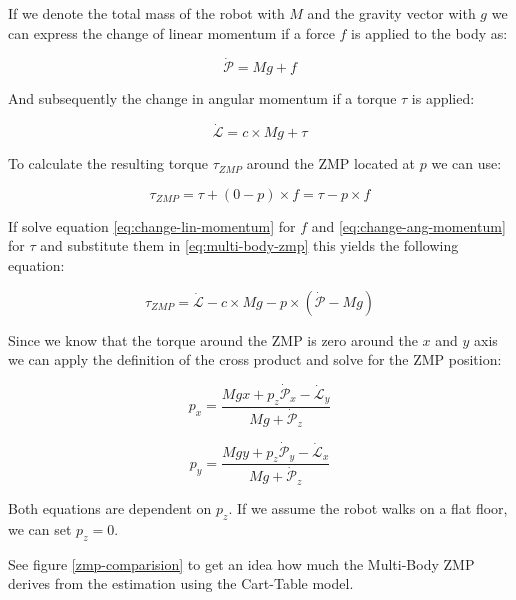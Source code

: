 \documentclass[english,ngerman]{KITreprt}
\begin{document}
If we denote the total mass of the robot with $M$ and the gravity vector
with $g$ we can express the change of linear momentum if a force $f$ is
applied to the body as:

\begin{equation} \label{eq:change-lin-momentum}
\dot{\mathcal{P}} = M g + f
\end{equation}

And subsequently the change in angular momentum if a torque $\tau$ is
applied:

\begin{equation} \label{eq:change-ang-momentum}
\dot{\mathcal{L}} = c \times Mg + \tau
\end{equation}

To calculate the resulting torque $\tau_{ZMP}$ around the ZMP located at
$p$ we can use:

\begin{equation} \label{eq:multi-body-zmp}
\tau_{ZMP} = \tau + (0 - p) \times f = \tau - p \times f
\end{equation}

If solve equation \ref{eq:change-lin-momentum} for $f$ and
\ref{eq:change-ang-momentum} for $\tau$ and substitute them in
\ref{eq:multi-body-zmp} this yields the following equation:

\begin{equation}
\tau_{ZMP} = \dot{\mathcal{L}} - c \times M g - p \times (\dot{\mathcal{P}} - Mg)
\end{equation}

Since we know that the torque around the ZMP is zero around the $x$ and
$y$ axis we can apply the definition of the cross product and solve for
the ZMP position:

\begin{equation}
p_x = \frac{Mgx + p_z \dot{\mathcal{P}}_x - \dot{\mathcal{L}}_y}{Mg + \dot{\mathcal{P}}_z}
\end{equation}

\begin{equation}
p_y = \frac{Mgy + p_z \dot{\mathcal{P}}_y - \dot{\mathcal{L}}_x}{Mg + \dot{\mathcal{P}}_z}
\end{equation}

Both equations are dependent on $p_z$. If we assume the robot walks on a
flat floor, we can set $p_z = 0$.

See figure \ref{zmp-comparision} to get an idea how much the Multi-Body
ZMP derives from the estimation using the Cart-Table model.
\end{document}
